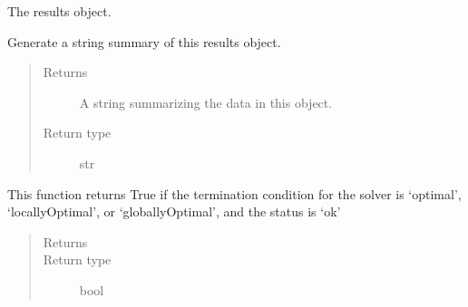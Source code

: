 \documentclass[letterpaper,10pt,english]{sphinxmanual}
\begin{document}
\begin{fulllineitems}
\label{\detokenize{reference/solverapi:pao.common.solver.Results}}
The results object.

\begin{fulllineitems}
\label{\detokenize{reference/solverapi:pao.common.solver.Results.__str__}}
Generate a string summary of this results object.
\begin{quote}\begin{description}
\item[{Returns}] \leavevmode
A string summarizing the data in this object.

\item[{Return type}] \leavevmode
str

\end{description}\end{quote}

\end{fulllineitems}


\begin{fulllineitems}
\label{\detokenize{reference/solverapi:pao.common.solver.Results.check_optimal_termination}}
This function returns True if the termination condition for the solver
is ‘optimal’, ‘locallyOptimal’, or ‘globallyOptimal’, and the status is ‘ok’
\begin{quote}\begin{description}
\item[{Returns}] \leavevmode


\item[{Return type}] \leavevmode
bool

\end{description}\end{quote}

\end{fulllineitems}



\end{fulllineitems}
\end{document}
